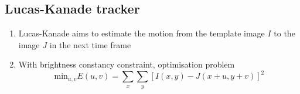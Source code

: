 \documentclass[9pt]{article}
\begin{document}
\begin{multicols*}{2}
    \subsection*{Lucas-Kanade tracker}
    \begin{enumerate}
        \item Lucas-Kanade aims to estimate the motion from the template image $I$ to 
        the image $J$ in the next time frame 
        \item With brightness constancy constraint, optimisation problem 
        $$
            \text{min}_{u,v} E(u,v) = \sum_x \sum_y [I(x,y) - J(x+u, y+v)]^2
        $$
    \end{enumerate}
    
\end{multicols*}
\end{document}
